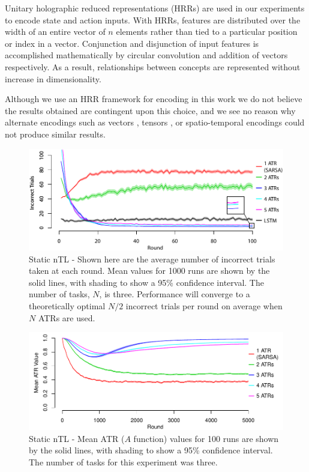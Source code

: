 \documentclass[10pt,letterpaper]{article}
\begin{document}
Unitary holographic reduced representations (HRRs) \cite{plate_holographic_1995} are used in our experiments to encode state and action inputs. With HRRs, features are distributed over the width of an entire vector of $ n $ elements rather than tied to a particular position or index in a vector. Conjunction and disjunction of input features is accomplished mathematically by circular convolution and addition of vectors respectively. As a result, relationships between concepts are represented without increase in dimensionality. 

Although we use an HRR framework for encoding in this work we do not believe the results obtained are contingent upon this choice, and we see no reason why alternate encodings such as vectors \cite{mitchell_composition_2010}, tensors \cite{papalexakis_tensors_2016}, or spatio-temporal encodings \cite{hummel_distributed_1997} could not produce similar results.

\begin{figure}[b!]
  \centering
  \includegraphics[scale=.75]{images/task_performance.pdf}
  \caption[]{Static nTL - Shown here are the average number of incorrect trials taken at each round. Mean values for 1000 runs are shown by the solid lines, with shading to show a 95\% confidence interval. The number of tasks, $N$, is three. Performance will converge to a theoretically optimal $ N/2 $ incorrect trials per round on average when $ N $ ATRs are used.}
  \label{fig:task_performance}
\end{figure}

\begin{figure}[b!]
  \centering
  \includegraphics[scale=.75]{images/static_rep_taskvals.pdf}
  \caption[]{Static nTL - Mean ATR ($A$ function) values for 100 runs are shown by the solid lines, with shading to show a 95\% confidence interval. The number of tasks for this experiment was three.}
  \label{fig:static_rep_taskvals}
\end{figure}
\end{document}
